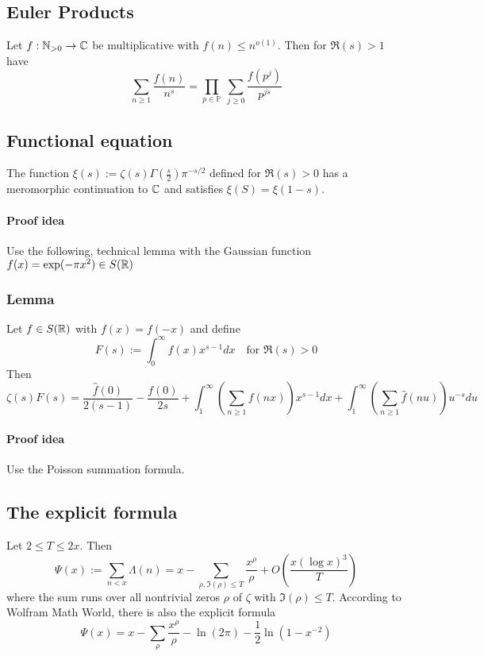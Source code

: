 \subsection{Euler Products}
Let $f: \mathbb{N}_{>0} \to \mathbb{C}$ be multiplicative with $f(n) \leq n^{o(1)}$. Then for $\Re(s) > 1$ have
\begin{equation*}
    \sum_{n \geq 1} \frac {f(n)} {n^s} = \prod_{p \in \mathbb{P}} \ \sum_{j \geq 0} \frac {f(p^j)} {p^{js}}
\end{equation*}

\subsection{Functional equation}
The function $\xi(s) := \zeta(s)\Gamma(\frac s 2) \pi^{-s/2}$ defined for $\Re(s) > 0$ has a meromorphic continuation to $\mathbb{C}$ and satisfies $\xi(S) = \xi(1 - s)$.
\paragraph{Proof idea} Use the following, technical lemma with the Gaussian function $f(x) = \exp(-\pi x^2) \in S(\mathbb{R})$ 
\subsubsection*{Lemma}
Let $f \in S(\mathbb{R})$ with $f(x) = f(-x)$ and define
\begin{equation*}
    F(s) := \int_0^\infty f(x) x^{s - 1} dx \quad \text{for $\Re(s) > 0$}
\end{equation*}
Then
\begin{equation*}
    \zeta(s)F(s) = \frac {\hat{f}(0)} {2(s - 1)} - \frac {f(0)} {2s} + \int_1^\infty \left( \sum_{n \geq 1} f(nx) \right) x^{s - 1} dx + \int_1^\infty \left( \sum_{n \geq 1} \hat{f}(nu) \right) u^{-s} du
\end{equation*}
\paragraph{Proof idea} Use the Poisson summation formula.

\subsection{The explicit formula}
Let $2 \leq T \leq 2x$. Then
\begin{equation*}
    \Psi(x) := \sum_{n < x} \Lambda(n) = x - \sum_{\rho, \Im(\rho) \leq T} \frac {x^\rho} \rho + O\left( \frac {x (\log x)^3} T \right)
\end{equation*}
where the sum runs over all nontrivial zeros $\rho$ of $\zeta$ with $\Im(\rho) \leq T$.
According to Wolfram Math World, there is also the explicit formula
\begin{equation*}
    \Psi(x) = x - \sum_\rho \frac {x^\rho} {\rho} - \ln(2\pi) - \frac 1 2 \ln\left(1 - x^{-2}\right)
\end{equation*}

